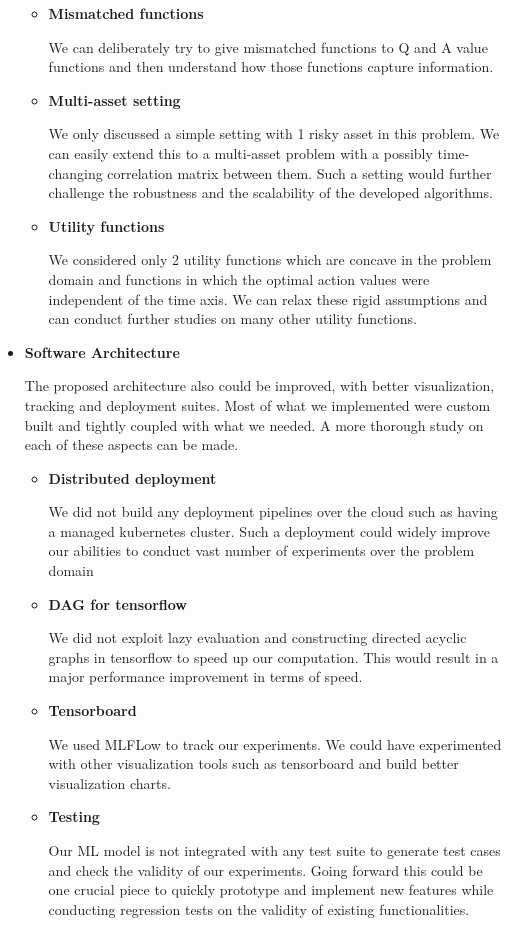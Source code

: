 \begin{itemize}
\begin{itemize}
        \item \textbf{Mismatched functions}

        We can deliberately try to give mismatched functions to Q and A value functions and then understand how those functions capture information.
    \item \textbf{Multi-asset setting}

    We only discussed a simple setting with 1 risky asset in this problem. We can easily extend this to a multi-asset problem with a possibly time-changing correlation matrix between them. Such a setting would further challenge the robustness and the scalability of the developed algorithms.
    
    \item \textbf{Utility functions}

    We considered only 2 utility functions which are concave in the problem domain and functions in which the optimal action values were independent of the time axis. We can relax these rigid assumptions and can conduct further studies on many other utility functions.
    \end{itemize}
    \item \textbf{Software Architecture}

    The proposed architecture also could be improved, with better visualization, tracking and deployment suites. Most of what we implemented were custom built and tightly coupled with what we needed. A more thorough study on each of these aspects can be made.
    \begin{itemize}
        \item 
    
    \textbf{Distributed deployment} 
    
    We did not build any deployment pipelines over the cloud such as having a managed kubernetes cluster. Such a deployment could widely improve our abilities to conduct vast number of experiments over the problem domain
    \item \textbf{DAG for tensorflow}
    
    We did not exploit lazy evaluation and constructing directed acyclic graphs in tensorflow to speed up our computation. This would result in a major performance improvement in terms of speed.

    
    \item \textbf{Tensorboard} 
    
    We used MLFLow to track our experiments. We could have experimented with other visualization tools such as tensorboard \cite{tensorboard} and build better visualization charts.

    
    \item \textbf{Testing} 
    
    Our ML model is not integrated with any test suite to generate test cases and  check the validity of our experiments. Going forward this could be one crucial piece to quickly prototype and implement new features while conducting regression tests \cite{howden1978} on the validity of existing functionalities. 
  
    \end{itemize}
    
\end{itemize}